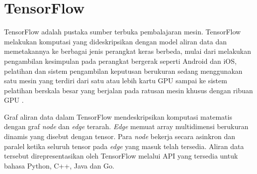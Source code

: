 \section{TensorFlow}
TensorFlow adalah pustaka sumber terbuka pembalajaran mesin. TensorFlow melakukan komputasi yang dideskripsikan dengan model aliran data dan memetakannya ke berbagai jenis perangkat keras berbeda, mulai dari melakukan pengambilan kesimpulan pada perangkat bergerak seperti Android dan iOS, pelatihan dan sistem pengambilan keputusan berukuran sedang menggunakan satu mesin yang terdiri dari satu atau lebih kartu GPU sampai ke sistem pelatihan berskala besar yang berjalan pada ratusan mesin khusus dengan ribuan GPU \Parencite{abadi-2015}.

Graf aliran data dalam TensorFlow mendeskripsikan komputasi matematis dengan graf \textit{node} dan \textit{edge} terarah. \textit{Edge} memuat array multidimensi berukuran dinamis yang disebut dengan tensor. Para \textit{node} bekerja secara asinkron dan paralel ketika seluruh tensor pada \textit{edge} yang masuk telah tersedia. Aliran data tersebut direpresentasikan oleh TensorFlow melalui API yang tersedia untuk bahasa Python, C++, Java dan Go.
